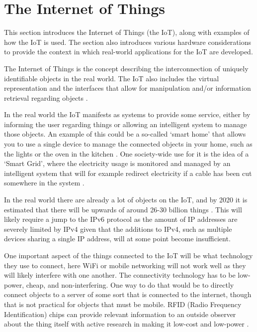 \section{The Internet of Things}
This section introduces the Internet of Things (the IoT), along with examples of how the IoT is used. The section also introduces various hardware considerations to provide the context in which real-world applications for the IoT are developed.

The Internet of Things is the concept describing the interconnection of uniquely identifiable objects in the real world.
The IoT also includes the virtual representation and the interfaces that allow for manipulation and/or information retrieval regarding objects \citep{misc:InternetOfThingsDefinition, misc:InternetOfThingsDefinition2, misc:InternetOfThingsDefinition3}.

In the real world the IoT manifests as systems to provide some service, either by informing the user regarding things or allowing an intelligent system to manage those objects.
An example of this could be a so-called `smart home' that allows you to use a single device to manage the connected objects in your home, such as the lights or the oven in the kitchen \citep{misc:InternetOfThingsExamples}.
One society-wide use for it is the idea of a `Smart Grid', where the electricity usage is monitored and managed by an intelligent system that will for example redirect electricity if a cable has been cut somewhere in the system \citep{misc:smartGrid}.

In the real world there are already a lot of objects on the IoT, and by 2020 it is estimated that there will be upwards of around 26-30 billion things \citep{misc:IoTGrowth1,misc:IoTGrowth2}.
This will likely require a jump to the IPv6 protocol as the amount of IP addresses are severely limited by IPv4 \citep{misc:numberOfAddresses} given that the additions to IPv4, such as multiple devices sharing a single IP address, will at some point become insufficient.

One important aspect of the things connected to the IoT will be what technology they use to connect, here WiFi or mobile networking will not work well as they will likely interfere with one another.
The connectivity technology has to be low-power, cheap, and non-interfering.
One way to do that would be to directly connect objects to a server of some sort that is connected to the internet, though that is not practical for objects that must be mobile.
RFID (Radio Frequency Identification) chips can provide relevant information to an outside observer about the thing itself \citep{misc:rfid} with active research in making it low-cost and low-power \citep{misc:rfid2}.

